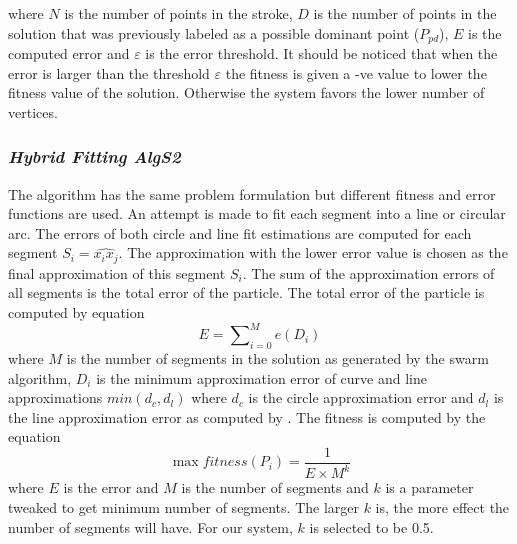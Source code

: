 \documentclass[preprint,1p,times,review]{elsarticle}
\begin{document}
   where $N$ is the number of points in the stroke, $D$ is the number of points in the solution that was previously labeled as a possible dominant point ($P_{pd}$), $E$ is the computed error and $\varepsilon$ is the error threshold. It should be noticed that when the error is larger than the threshold $\varepsilon$ the fitness is given a -ve value to lower the fitness value of the solution. Otherwise the system favors the lower number of vertices.

 \subsubsection{\textit{Hybrid Fitting \textsl{AlgS2}}} 
 The algorithm has the same problem formulation but different fitness and error functions are used. An attempt is made to fit each segment into a line or circular arc. The errors of both circle and line fit estimations are computed for each segment $S_i=\widehat{x_ix_j}$. The approximation with the lower error value is chosen as the final approximation of this segment $S_i$\cite{CruveDivisionSwarm}. The sum of the approximation errors of all segments is the total error of the particle.  The total error of the particle is computed by equation %
 \begin{equation}
E=\sum\nolimits_{i = 0}^M e(D_i)
\label{eq:errorSwarm2}
\end{equation}where $M$ is the number of segments in the solution as generated
by the swarm algorithm, $D_i$ is the minimum approximation error of curve and
line approximations $min(d_c,d_l)$ where $d_c$ is the circle approximation error
and $d_l$ is the line approximation error as computed by
\cite{CruveDivisionSwarm}.  The fitness is computed by the equation
\begin{equation}
\max fitness(P_i ) = \frac{1}{{E \times M^k }}
\label{eq:fitnessSwarm2}
\end{equation} where $E$ is the error and $M$ is the number of segments and $k$
is a parameter tweaked to get minimum number of segments. The larger $k$ is, the
more effect the number of segments will have. For our system, $k$ is selected to
be 0.5\cite{CruveDivisionSwarm}. 
\end{document}

